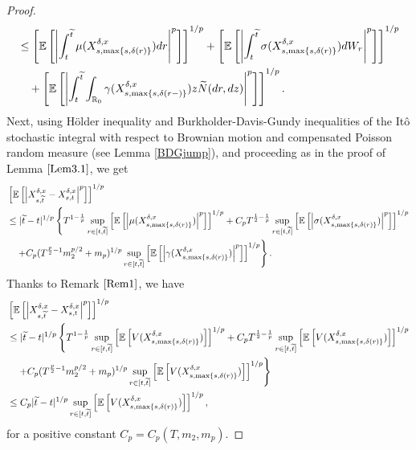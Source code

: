 \documentclass[11pt]{article}
\theoremstyle{theorem}
\theoremstyle{definition}
\newcommand{\bR}{\mathbb{R}}
\newcommand{\1}{{\bf 1}}
\begin{document}
\begin{proof}
\begin{align}
&\leq \left[\mathbb{E} \left[\left| \int_t^{\widetilde{t}} \mu(X_{s,\max\{s,\delta(r)\}}^{\delta,x}) dr \right|^p \right]\right]^{1/p} + \left[\mathbb{E} \left[\left| \int_t^{\widetilde{t}} \sigma(X_{s,\max\{s,\delta(r)\}}^{\delta,x}) dW_r \right|^p \right]\right]^{1/p} \notag \\
& \quad + \left[\mathbb{E} \left[\left| \int_t^{\widetilde{t}} \int _{\bR_0}\gamma (X_{s,\max\{s,\delta(r-)\}}^{\delta,x}) z \widetilde{N}(dr, dz) \right|^p\right]\right]^{1/p}.
\end{align}
Next, using H\"older inequality and Burkholder-Davis-Gundy inequalities of the It\^o stochastic integral with respect to Brownian motion and compensated Poisson random measure (see Lemma \ref{BDGjump}), and proceeding as in the proof of Lemma $\ref{Lem3.1}$, we get
\begin{align}
\label{s,wt}
&\left[\mathbb{E}\left[\left|X^{\delta, x}_{s,\widetilde{t}}-X^{\delta, x}_{s,t}\right|^p\right]\right]^{1/p} \notag \\
& \leq |\widetilde{t} -t|^{1/p} \left\{ T^{1-\frac{1}{p}} \sup_{r\in [t, \widetilde{t}]}  \left[\mathbb{E} \left[\left| \mu (X_{s,\max\{s,\delta(r)\}}^{\delta,x}) \right|^p \right]\right]^{1/p} + C_p T^{\frac{1}{2}-\frac{1}{p}} \sup_{r\in [t, \widetilde{t}]}  \left[\mathbb{E} \left[\left| \sigma (X_{s,\max\{s,\delta(r)\}}^{\delta,x}) \right|^p \right]\right]^{1/p} \right.\notag\\
 & \quad \left. + C_p (T^{\frac{p}{2} -1} m_2^{p/2} + m_p)^{1/p} \sup_{r\in [t, \widetilde{t}]}  \left[\mathbb{E} \left[\left| \gamma (X_{s,\max\{s,\delta(r)\}}^{\delta,x}) \right|^p \right]\right]^{1/p} \right\}.
\end{align}
Thanks to Remark $\ref{Rem1}$, we have
\begin{align*}
&\left[\mathbb{E}\left[\left|X^{\delta, x}_{s,\widetilde{t}}-X^{\delta, x}_{s,t}\right|^p\right]\right]^{1/p} \notag \\
& \leq |\widetilde{t} -t|^{1/p} \left\{ T^{1-\frac{1}{p}} \sup_{r\in [t, \widetilde{t}]}  \left[\mathbb{E}\left[V(X_{s,\max\{s,\delta(r)\}}^{\delta,x})\right]\right]^{1/p}  + C_p T^{\frac{1}{2}-\frac{1}{p}} \sup_{r\in [t, \widetilde{t}]}  \left[\mathbb{E}\left[V(X_{s,\max\{s,\delta(r)\}}^{\delta,x})\right]\right]^{1/p}  \right.\notag\\
 & \quad \left. + C_p (T^{\frac{p}{2} -1} m_2^{p/2} + m_p)^{1/p} \sup_{r\in [t, \widetilde{t}]}  \left[\mathbb{E} \left[V(X_{s,\max\{s,\delta(r)\}}^{\delta,x})\right]\right]^{1/p} \right\} \notag\\
& \le C_p |\widetilde{t} -t|^{1/p} \sup_{r\in [t, \widetilde{t}]} \left[\mathbb{E} \left[ V(X_{s,\max\{s,\delta(r)\}}^{\delta,x}) \right] \right]^{1/p},
\end{align*} 
for a positive constant $C_p=C_p(T,m_2, m_p)$.


\end{proof}
\end{document}
